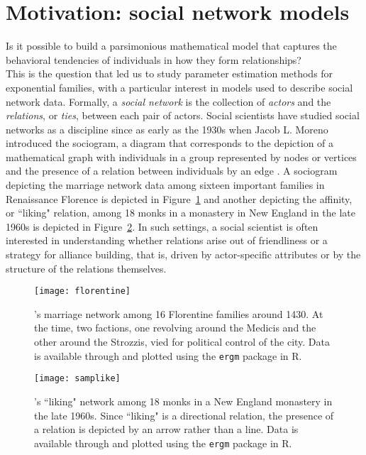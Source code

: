 \section{Motivation: social network models}
Is it possible to build a parsimonious mathematical model that captures the 
behavioral tendencies of individuals in how they form relationships?\\  %

This is the question that led us to study parameter estimation methods for exponential 
families, with a particular interest in models used to describe social network data.  
Formally, a \emph{social network} is the collection of \emph{actors} and the 
\emph{relations}, or \emph{ties}, between each pair of actors.
Social scientists have studied social networks as a discipline since as early as the 
1930s when Jacob L. Moreno introduced the sociogram, a diagram that corresponds to
the depiction of a mathematical graph with individuals in a group 
represented by nodes or vertices and the presence of a relation between 
individuals by an edge \citep{Wasserman:1994}.  
A sociogram depicting the marriage network data among sixteen 
important families in Renaissance Florence \citep{Padgett} is depicted in 
Figure~\ref{F:Florentine} and another depicting the affinity, or ``liking" relation, among 18 
monks in a monastery in New England in the late 1960s \citep{Sampson} is depicted in 
Figure~\ref{F:Sampson}.  In such settings, a social scientist is often interested in 
understanding whether relations arise out of friendliness or a strategy for alliance 
building, that is, driven by actor-specific attributes or by the structure of  the relations themselves.
\begin{figure}
\begin{center}
\texttt{[image: florentine]} %
\end{center}
\caption{\citeauthor{Padgett}'s \citeyearpar{Padgett} marriage network among 16 
Florentine families around 1430.  At the time, two factions, one revolving around the 
Medicis and the other around the Strozzis, vied for political control of the city.   
Data is available through and plotted using the \texttt{ergm} package \citep*{ergm} in 
R.}
\label{F:Florentine}
\end{figure}

\begin{figure}
\begin{center}
\texttt{[image: samplike]}
\end{center}
\caption{\citeauthor{Sampson}'s \citeyearpar{Sampson} ``liking" network among 18 monks 
in a New England monastery in the late 1960s.  Since ``liking" is a directional 
relation, the presence of a relation is depicted by an arrow rather than a line.  Data 
is available through and plotted using the \texttt{ergm} package \citep{ergm} in R.}
\label{F:Sampson}
\end{figure}

